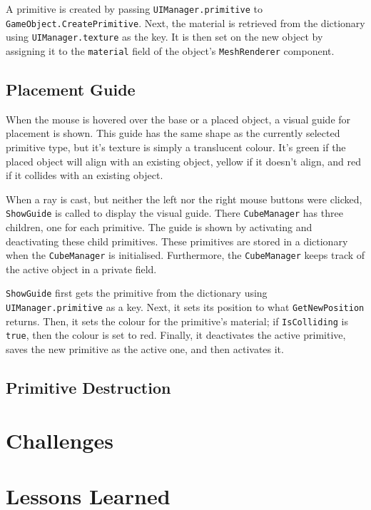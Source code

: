 \documentclass[a4paper, 12pt]{scrartcl}
\begin{document}
A primitive is created by passing \texttt{UIManager.primitive} to \texttt{GameObject.CreatePrimitive}. Next, the material is retrieved from the dictionary using \texttt{UIManager.texture} as the key. It is then set on the new object by assigning it to the \texttt{material} field of the object's \texttt{MeshRenderer} component.

\subsection{Placement Guide}
When the mouse is hovered over the base or a placed object, a visual guide for placement is shown. This guide has the same shape as the currently selected primitive type, but it's texture is simply a translucent colour. It's green if the placed object will align with an existing object, yellow if it doesn't align, and red if it collides with an existing object.

When a ray is cast, but neither the left nor the right mouse buttons were clicked, \texttt{ShowGuide} is called to display the visual guide. There \texttt{CubeManager} has three children, one for each primitive. The guide is shown by activating and deactivating these child primitives. These primitives are stored in a dictionary when the \texttt{CubeManager} is initialised. Furthermore, the \texttt{CubeManager} keeps track of the active object in a private field.

\texttt{ShowGuide} first gets the primitive from the dictionary using \texttt{UIManager.primitive} as a key. Next, it sets its position to what \texttt{GetNewPosition} returns. Then, it sets the colour for the primitive's material; if \texttt{IsColliding} is \texttt{true}, then the colour is set to red. Finally, it deactivates the active primitive, saves the new primitive as the active one, and then activates it.

\subsection{Primitive Destruction}

\section{Challenges}

\section{Lessons Learned}
\end{document}
